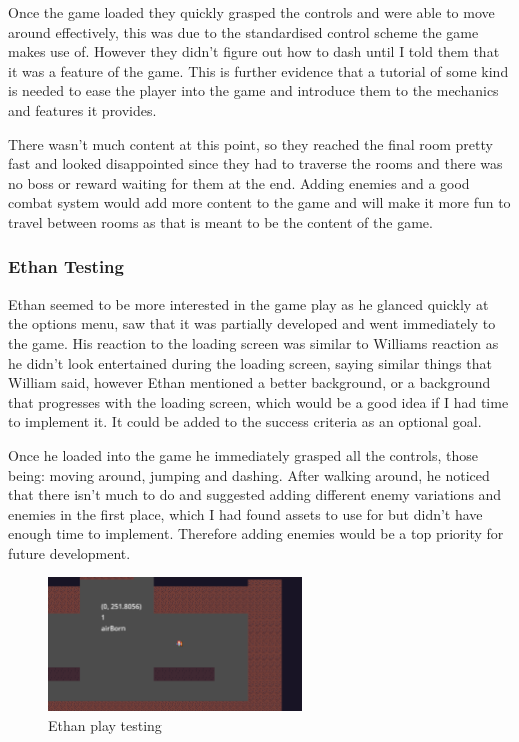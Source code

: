 \documentclass{article}
\newcommand{\parBr}{\vspace{5mm}}%
\begin{document}
\parBr

Once the game loaded they quickly grasped the controls and were able to move around effectively, this was due to the standardised control scheme the game makes use of. However they didn't figure out how to dash until I told them that it was a feature of the game. This is further evidence that a tutorial of some kind is needed to ease the player into the game and introduce them to the mechanics and features it provides.

\parBr

There wasn't much content at this point, so they reached the final room pretty fast and looked disappointed since they had to traverse the rooms and there was no boss or reward waiting for them at the end. Adding enemies and a good combat system would add more content to the game and will make it more fun to travel between rooms as that is meant to be the content of the game.

\subsubsection{Ethan Testing}
Ethan seemed to be more interested in the game play as he glanced quickly at the options menu, saw that it was partially developed and went immediately to the game. His reaction to the loading screen was similar to Williams reaction as he didn't look entertained during the loading screen, saying similar things that William said, however Ethan mentioned a better background, or a background that progresses with the loading screen, which would be a good idea if I had time to implement it. It could be added to the success criteria as an optional goal.

\parBr

Once he loaded into the game he immediately grasped all the controls, those being: moving around, jumping and dashing. After walking around, he noticed that there isn't much to do and suggested adding different enemy variations and enemies in the first place, which I had found assets to use for but didn't have enough time to implement. Therefore adding enemies would be a top priority for future development. 

\begin{figure}[H]
\centering
\includegraphics[width=0.6\textwidth]{ethan testing}
\caption{Ethan play testing}
\label{ethan_test}
\end{figure}
\end{document}
